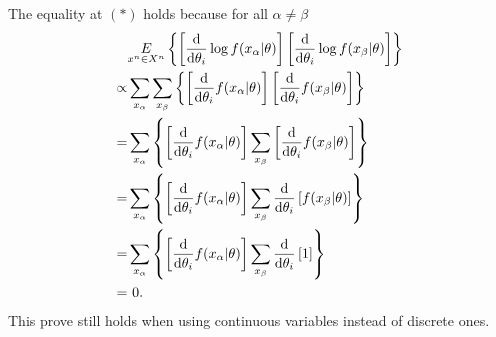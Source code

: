 The equality at $(*)$ holds because for all $\alpha \neq \beta$
\begin{equation}
	\begin{split}
		&\underset{x^n \in X^n}{E} \left\{ \left[\frac{\mathrm{d}}{\mathrm{d}\theta_i} \log f(x_\alpha|\theta)\right]\left[\frac{\mathrm{d}}{\mathrm{d}\theta_i} \log f(x_\beta|\theta)\right]\right\} \\
		\propto& \sum_{x_\alpha}\sum_{x_\beta} \left\{ \left[\frac{\mathrm{d}}{\mathrm{d}\theta_i}  f(x_\alpha|\theta)\right]\left[\frac{\mathrm{d}}{\mathrm{d}\theta_i}  f(x_\beta|\theta)\right]\right\}\\
		=& \sum_{x_\alpha} \left\{ \left[\frac{\mathrm{d}}{\mathrm{d}\theta_i}  f(x_\alpha|\theta)\right]\sum_{x_\beta}\left[\frac{\mathrm{d}}{\mathrm{d}\theta_i}  f(x_\beta|\theta)\right]\right\}\\
		=& \sum_{x_\alpha} \left\{ \left[\frac{\mathrm{d}}{\mathrm{d}\theta_i}  f(x_\alpha|\theta)\right]\sum_{x_\beta}\frac{\mathrm{d}}{\mathrm{d}\theta_i}\left[  f(x_\beta|\theta)\right]\right\}\\
		=& \sum_{x_\alpha} \left\{ \left[\frac{\mathrm{d}}{\mathrm{d}\theta_i}  f(x_\alpha|\theta)\right]\sum_{x_\beta}\frac{\mathrm{d}}{\mathrm{d}\theta_i}\left[ 1\right]\right\}\\
		=&\ 0.
	\end{split}
\end{equation}
This prove still holds when using continuous variables instead of discrete ones.
